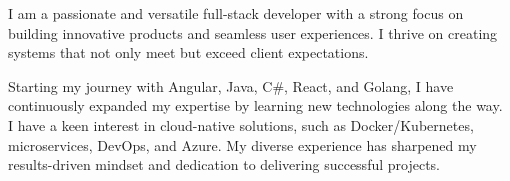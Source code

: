 I am a passionate and versatile full-stack developer 
with a strong focus on building innovative products 
and seamless user experiences.  
I thrive on creating systems that not only meet 
but exceed client expectations.  

Starting my journey with Angular, Java, C\#, React, 
and Golang, 
I have continuously expanded my expertise by learning 
new technologies along the way.  
I have a keen interest in cloud-native 
solutions, such as Docker/Kubernetes, microservices, DevOps, and 
Azure. 
My diverse experience has sharpened my results-driven 
mindset and dedication to delivering successful projects.  

\vspace{\baselineskip}  
